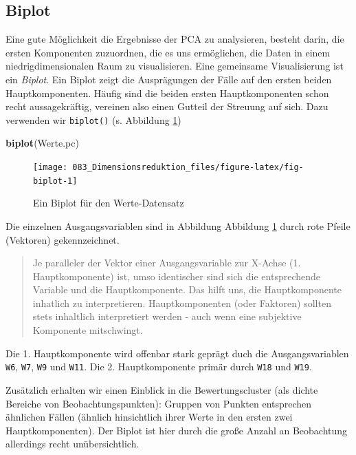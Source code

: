 \documentclass[12pt,ngerman,]{book}
\makeatletter
\newenvironment{Shaded}{\begin{snugshade}}{\end{snugshade}}
\newcommand{\KeywordTok}[1]{\textcolor[rgb]{0.13,0.29,0.53}{\textbf{{#1}}}}
\newcommand{\NormalTok}[1]{{#1}}
\newenvironment{kframe}{%
\medskip{}
\setlength{\fboxsep}{.8em}
 \def\at@end@of@kframe{}%
 \ifinner\ifhmode%
  \def\at@end@of@kframe{\end{minipage}}%
  \begin{minipage}{\columnwidth}%
 \fi\fi%
 \def\FrameCommand##1{\hskip\@totalleftmargin \hskip-\fboxsep
 \colorbox{shadecolor}{##1}\hskip-\fboxsep
     \hskip-\linewidth \hskip-\@totalleftmargin \hskip\columnwidth}%
 \MakeFramed {\advance\hsize-\width
   \@totalleftmargin\z@ \linewidth\hsize
   \@setminipage}}%
 {\par\unskip\endMakeFramed%
 \at@end@of@kframe}
\renewenvironment{Shaded}{\begin{kframe}}{\end{kframe}}
\theoremstyle{definition}
\theoremstyle{definition}
\theoremstyle{remark}
\makeatother
\begin{document}
\subsection{Biplot}\label{biplot}

Eine gute Möglichkeit die Ergebnisse der PCA zu analysieren, besteht
darin, die ersten Komponenten zuzuordnen, die es uns ermöglichen, die
Daten in einem niedrigdimensionalen Raum zu visualisieren. Eine
gemeinsame Visualisierung ist ein \emph{Biplot}. Ein
Biplot zeigt die Ausprägungen der Fälle auf den ersten beiden
Hauptkomponenten. Häufig sind die beiden ersten Hauptkomponenten schon
recht aussagekräftig, vereinen also einen Gutteil der Streuung auf sich.
Dazu verwenden wir \texttt{biplot()} (s. Abbildung \ref{fig:fig-biplot})

\begin{Shaded}
\begin{Highlighting}[]
\KeywordTok{biplot}\NormalTok{(Werte.pc)}
\end{Highlighting}
\end{Shaded}

\begin{figure}

{\centering \texttt{[image: 083\_Dimensionsreduktion\_files/figure-latex/fig-biplot-1]} 

}

\caption{Ein Biplot für den Werte-Datensatz}\label{fig:fig-biplot}
\end{figure}

Die einzelnen Ausgangsvariablen sind in Abbildung Abbildung
\ref{fig:fig-biplot} durch rote Pfeile (Vektoren) gekennzeichnet.

\begin{quote}
Je paralleler der Vektor einer Ausgangsvariable zur X-Achse (1.
Hauptkomponente) ist, umso identischer sind sich die entsprechende
Variable und die Hauptkomponente. Das hilft uns, die Hauptkomponente
inhatlich zu interpretieren. Hauptkomponenten (oder Faktoren) sollten
stets inhaltlich interpretiert werden - auch wenn eine subjektive
Komponente mitschwingt.
\end{quote}

Die 1. Hauptkomponente wird offenbar stark geprägt duch die
Ausgangsvariablen \texttt{W6}, \texttt{W7}, \texttt{W9} und
\texttt{W11}. Die 2. Hauptkomponente primär durch \texttt{W18} und
\texttt{W19}.

Zusätzlich erhalten wir einen Einblick in die Bewertungscluster (als
dichte Bereiche von Beobachtungspunkten): Gruppen von Punkten
entsprechen ähnlichen Fällen (ähnlich hinsichtlich ihrer Werte in den
ersten zwei Hauptkomponenten). Der Biplot ist hier durch die große
Anzahl an Beobachtung allerdings recht unübersichtlich.
\end{document}
